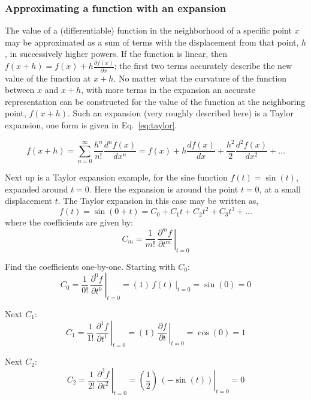 \documentclass[12pt]{article}
\begin{document}
\begin{flushleft}
\subsubsection*{\textbf{\color{mygreen} Approximating a function with an expansion}}

The value of a (differentiable) function in the neighborhood of a specific point $x$ may be approximated as a sum of terms with the displacement from that point, $h$, in successively higher powers.  If the function is linear, then $f(x+h)=f(x) + h\frac{\partial f(x)}{\partial x}$; the first two terms accurately describe the new value of the function at $x+h$.  No matter what the curvature of the function between $x$ and $x+h$, with more terms in the expansion an accurate representation can be constructed for the value of the function at the neighboring point, $f(x+h)$.  Such an expansion (very roughly described here) is a Taylor expansion, one form is given in Eq.~\ref{eq:taylor}.

\begin{equation}
f(x+h)=\sum_{n=0}^{\infty} \frac{h^{n}}{n!}\frac{d^{n}f(x)}{dx^{n}}=f(x)+h\frac{df(x)}{dx}+\frac{h^{2}}{2}\frac{d^{2}f(x)}{dx^{2}}+\dots
\label{eq:taylor}
\end{equation}

Next up is a Taylor expansion example, for the sine function $f(t)=\sin{(t)}$, expanded around $t=0$.  
Here the expansion is around the point $t=0$, at a small displacement $t$.  The Taylor expansion in this case may be written as, 
\begin{equation}
f(t) = \sin{(0+t)} = C_{0} + C_{1}t + C_{2}t^{2} + C_{3}t^{3} + \dots
\label{eq:Taylorsine}
\end{equation}
where the coefficients are given by:
\[
C_{m}=\left. \frac{1}{m!}\,\frac{\partial^{m}f}{\partial t^{m}}\, \right|_{t=0} 
\]

Find the coefficients one-by-one.  Starting with $C_{0}$:
\[
C_{0}=\left. \frac{1}{0!}\,\frac{\partial^{0}f}{\partial t^{0}}\, \right|_{t=0} = 
\left. (1)\, f(t) \, \right|_{t=0} = \sin{(0)} = 0
\]

Next $C_{1}$:
\[
C_{1}=\left. \frac{1}{1!}\,\frac{\partial^{1}f}{\partial t^{1}}\, \right|_{t=0}
=  \left. (1)\,\frac{\partial f}{\partial t}\, \right|_{t=0} = \cos{(0)} = 1
\]

Next $C_{2}$:
\[
C_{2}=\left. \frac{1}{2!}\,\frac{\partial^{2}f}{\partial t^{2}}\, \right|_{t=0}
=  \left. \left(\frac{1}{2}\right) \, \left( -\sin{(t)} \right)  \right|_{t=0} = 0
\]


\end{flushleft}
\end{document}
